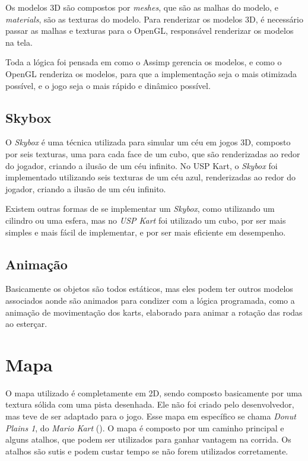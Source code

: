 Os modelos 3D são compostos por \textit{meshes}, que são as malhas do modelo, e \textit{materials}, são as texturas do modelo. Para renderizar os modelos 3D, é necessário passar as malhas e texturas para o OpenGL, responsável renderizar os modelos na tela.

Toda a lógica foi pensada em como o Assimp gerencia os modelos, e como o OpenGL renderiza os modelos, para que a implementação seja o mais otimizada possível, e o jogo seja o mais rápido e dinâmico possível.

\subsection{Skybox}

O \textit{Skybox} é uma técnica utilizada para simular um céu em jogos 3D, composto por seis texturas, uma para cada face de um cubo, que são renderizadas ao redor do jogador, criando a ilusão de um céu infinito. No USP Kart, o \textit{Skybox} foi implementado utilizando seis texturas de um céu azul, renderizadas ao redor do jogador, criando a ilusão de um céu infinito.

Existem outras formas de se implementar um \textit{Skybox}, como utilizando um cilindro ou uma esfera, mas no \textit{USP Kart} foi utilizado um cubo, por ser mais simples e mais fácil de implementar, e por ser mais eficiente em desempenho.

\subsection{Animação}

Basicamente os objetos são todos estáticos, mas eles podem ter outros modelos associados aonde são animados para condizer com a lógica programada, como a animação de movimentação dos karts, elaborado para animar a rotação das rodas ao esterçar.

\section{Mapa}

O mapa utilizado é completamente em 2D, sendo composto basicamente por uma textura sólida com uma pista desenhada. Ele não foi criado pelo desenvolvedor, mas teve de ser adaptado para o jogo. Esse mapa em específico se chama \textit{Donut Plains 1}, do \textit{Mario Kart} (\cite{marioKart}). O mapa é composto por um caminho principal e alguns atalhos, que podem ser utilizados para ganhar vantagem na corrida. Os atalhos são sutis e podem custar tempo se não forem utilizados corretamente.

